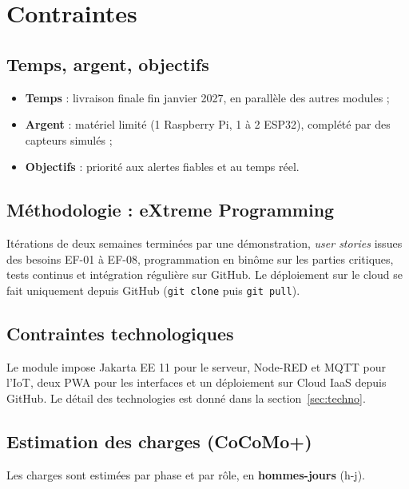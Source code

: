 \documentclass[11pt,a4paper]{article}
\let\oldsection\section
\renewcommand{\section}{\Needspace{10\baselineskip}\oldsection}
\begin{document}
\section{Contraintes}

\subsection{Temps, argent, objectifs}
\begin{itemize}
  \item \textbf{Temps} : livraison finale fin janvier 2027, en parallèle des autres modules ;
  \item \textbf{Argent} : matériel limité (1 Raspberry Pi, 1 à 2 ESP32), complété par des capteurs simulés ;
  \item \textbf{Objectifs} : priorité aux alertes fiables et au temps réel.
\end{itemize}

\subsection{Méthodologie : eXtreme Programming}
Itérations de deux semaines terminées par une démonstration, \textit{user stories} issues
des besoins EF-01 à EF-08, programmation en binôme sur les parties critiques, tests continus
et intégration régulière sur GitHub. Le déploiement sur le cloud se fait uniquement depuis
GitHub (\texttt{git clone} puis \texttt{git pull}).

\subsection{Contraintes technologiques}
Le module impose Jakarta EE 11 pour le serveur, Node-RED et MQTT pour l'IoT, deux PWA
pour les interfaces et un déploiement sur Cloud IaaS depuis GitHub. Le détail des
technologies est donné dans la section~\ref{sec:techno}.

\subsection{Estimation des charges (CoCoMo+)}
Les charges sont estimées par phase et par rôle, en \textbf{hommes-jours} (h-j).
\end{document}
